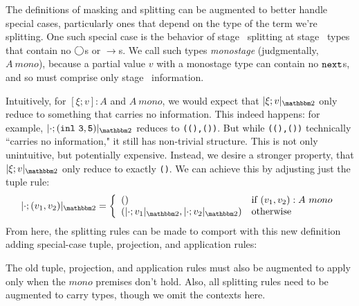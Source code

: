The definitions of masking and splitting can be augmented to better handle special cases,
particularly ones that depend on the type of the term we're splitting.
One such special case is the behavior of stage \bbone\ splitting at stage \bbone\ types that contain no $\bigcirc$s or $\to$s.
We call such types {\em monostage} (judgmentally, $A~mono$), 
because a partial value $v$ with a monostage type can contain no ${\tt next}$s,
and so must comprise only stage \bbone\ information.

Intuitively, for $[\xi;v] : A$ and $A~mono$, 
we would expect that $\maskt{\xi;v}$ only reduce to something that carries no information.
This indeed happens: for example, $\maskt {\cdot;\mathtt{(inl~3,5)}}$ reduces to \texttt{((),())}.
But while \texttt{((),())} technically ``carries no information," it still has non-trivial structure.
This is not only unintuitive, but potentially expensive.
Instead, we desire a stronger property, that $\maskt{\xi;v}$ only reduce to exactly \texttt{()}. 
We can achieve this by adjusting just the tuple rule:
\[
\maskt{\cdot;(v_1,v_2)} = \left\{ \begin{array}{ll} 
\mathtt{()} &\text{if } (v_1,v_2):A~mono\\ 
(\maskt{\cdot;v_1},\maskt{\cdot;v_2}) &\text{otherwise} \end{array} \right.
\]
From here, the splitting rules can be made to comport with this new 
definition adding special-case tuple, projection, and application 
rules:
The old tuple, projection, and application rules 
must also be augmented to apply only when the $mono$ premises don't hold.
Also, all splitting rules need to be augmented to carry types, though
we omit the contexts here.
